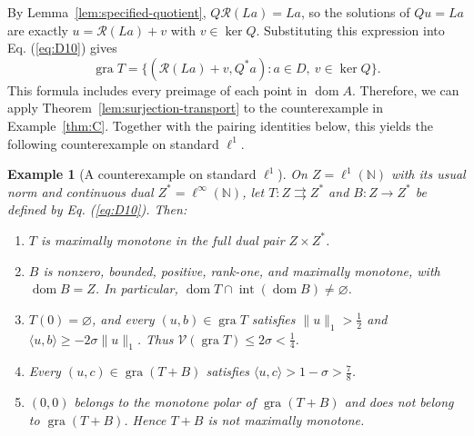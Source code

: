 \documentclass[11pt]{article}
\newcommand{\N}{\mathbb N}
\newcommand{\gra}{\operatorname{gra}}
\newcommand{\dom}{\operatorname{dom}}
\newcommand{\pair}[2]{\langle #1,#2\rangle}
\newtheorem{example}{Example}
\theoremstyle{definition}
\theoremstyle{remark}
\begin{document}
By Lemma~\ref{lem:specified-quotient}, $Q\mathcal R(La)=La$, so the solutions of $Qu=La$ are exactly $u=\mathcal R(La)+v$ with $v\in\ker Q$. Substituting this expression into Eq. (\ref{eq:D10}) gives
\begin{equation}
\gra T=\{(\mathcal R(La)+v,Q^*a):a\in D,\ v\in\ker Q\}.
\label{eq:L4}
\end{equation}
This formula includes every preimage of each point in $\dom A$. Therefore, we can apply Theorem~\ref{lem:surjection-transport} to the counterexample in Example~\ref{thm:C}. Together with the pairing identities below, this yields the following counterexample on standard $\ell^1$.


\begin{example}[A counterexample on standard $\ell^1$]\label{thm:L}
On $Z=\ell^1(\N)$ with its usual norm and continuous dual $Z^*=\ell^\infty(\N)$, let $T:Z\rightrightarrows Z^*$ and $B:Z\to Z^*$ be defined by Eq. (\ref{eq:D10}). Then:
\begin{enumerate}
\item\label{thm:L-maximality} $T$ is maximally monotone in the full dual pair $Z\times Z^*$.
\item\label{thm:L-partner} $B$ is nonzero, bounded, positive, rank-one, and maximally monotone,
with $\dom B=Z$. In particular, $\dom T\cap\operatorname{int}(\dom B)\ne\varnothing$.
\item\label{thm:L-bound} $T(0)=\varnothing$, and every $(u,b)\in\gra T$ satisfies
$\|u\|_1>\frac{1}{2}$ and $\pair{u}{b}\ge-2\sigma\|u\|_1$. Thus $\mathcal V(\gra T)\le2\sigma<\frac{1}{4}$.
\item\label{thm:L-pairing} Every $(u,c)\in\gra(T+B)$ satisfies
$\pair{u}{c}>1-\sigma>\frac{7}{8}$.
\item\label{thm:L-sum} $(0,0)$ belongs to the monotone polar of $\gra(T+B)$ and does
not belong to $\gra(T+B)$. Hence $T+B$ is not maximally monotone.
\end{enumerate}
\end{example}
\end{document}
